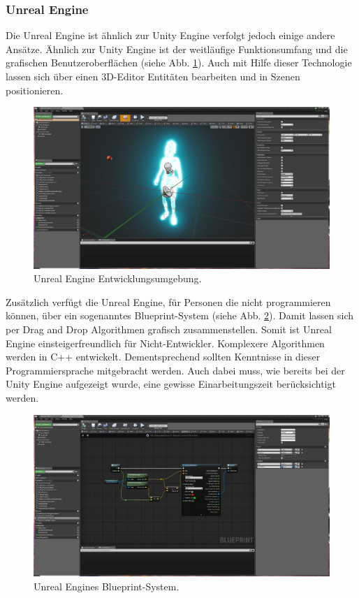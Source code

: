 \documentclass[a4paper,12pt,oneside]{article}
\begin{document}
      \subsubsection{Unreal Engine}
        Die Unreal Engine ist ähnlich zur 
        Unity Engine verfolgt jedoch einige andere Ansätze. Ähnlich zur
        Unity Engine ist der weitläufige Funktionsumfang und die grafischen
        Benutzeroberflächen (siehe Abb. \ref{fig:unreal1}). 
        Auch mit Hilfe dieser Technologie lassen sich über 
        einen 3D-Editor Entitäten bearbeiten und in Szenen positionieren.
        \begin{figure}[t]
          \centering
          \includegraphics[scale=0.35]{img/unreal1.png}
          \caption{Unreal Engine Entwicklungsumgebung.}
          \label{fig:unreal1}
        \end{figure}
        Zusätzlich verfügt die Unreal Engine,
        für Personen die nicht programmieren können, über ein sogenanntes Blueprint-System
        (siehe Abb. \ref{fig:unreal2}).
        Damit lassen sich per Drag and Drop Algorithmen grafisch zusammenstellen. Somit
        ist Unreal Engine einsteigerfreundlich für Nicht-Entwickler.
        Komplexere Algorithmen werden in C++ entwickelt. Dementsprechend sollten 
        Kenntnisse in dieser Programmiersprache mitgebracht werden. 
        Auch dabei muss, wie bereits bei der Unity Engine aufgezeigt
        wurde, eine gewisse Einarbeitungszeit berücksichtigt werden.
        \begin{figure}[h]
          \centering
          \includegraphics[scale=0.35]{img/unreal2.png}
          \caption{Unreal Engines Blueprint-System.}
          \label{fig:unreal2}
        \end{figure} \\
\end{document}
